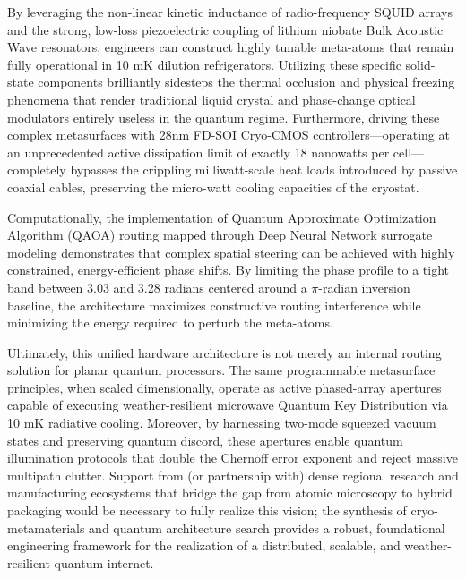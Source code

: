 \documentclass[11pt, a4paper]{article}
\begin{document}
By leveraging the non-linear kinetic inductance of radio-frequency SQUID arrays and the strong, low-loss piezoelectric coupling of lithium niobate Bulk Acoustic Wave resonators, engineers can construct highly tunable meta-atoms that remain fully operational in 10 mK dilution refrigerators. Utilizing these specific solid-state components brilliantly sidesteps the thermal occlusion and physical freezing phenomena that render traditional liquid crystal and phase-change optical modulators entirely useless in the quantum regime. Furthermore, driving these complex metasurfaces with 28nm FD-SOI Cryo-CMOS controllers---operating at an unprecedented active dissipation limit of exactly 18 nanowatts per cell---completely bypasses the crippling milliwatt-scale heat loads introduced by passive coaxial cables, preserving the micro-watt cooling capacities of the cryostat.

Computationally, the implementation of Quantum Approximate Optimization Algorithm (QAOA) routing mapped through Deep Neural Network surrogate modeling demonstrates that complex spatial steering can be achieved with highly constrained, energy-efficient phase shifts. By limiting the phase profile to a tight band between 3.03 and 3.28 radians centered around a $\pi$-radian inversion baseline, the architecture maximizes constructive routing interference while minimizing the energy required to perturb the meta-atoms.

Ultimately, this unified hardware architecture is not merely an internal routing solution for planar quantum processors. The same programmable metasurface principles, when scaled dimensionally, operate as active phased-array apertures capable of executing weather-resilient microwave Quantum Key Distribution via 10 mK radiative cooling. Moreover, by harnessing two-mode squeezed vacuum states and preserving quantum discord, these apertures enable quantum illumination protocols that double the Chernoff error exponent and reject massive multipath clutter. Support from (or partnership with) dense regional research and manufacturing ecosystems that bridge the gap from atomic microscopy to hybrid packaging would be necessary to fully realize this vision; the synthesis of cryo-metamaterials and quantum architecture search provides a robust, foundational engineering framework for the realization of a distributed, scalable, and weather-resilient quantum internet.
\end{document}
